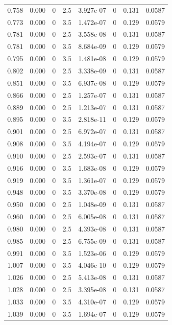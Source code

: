 \documentclass[preview]{standalone}
\begin{document}
{{{\begin{tabular}{L{1.2cm}C{1.2cm} C{0.3cm}C{0.5cm} C{1.4cm}C{1.4cm} C{1.4cm}C{1.4cm}}
  0.758  &  0.000  & 0     & 2.5 &  3.927e-07  & 0  & 0.131 &  0.0587   \\ 
  0.773  &  0.000  & 0     & 3.5 &  1.472e-07  & 0  & 0.129 &  0.0579   \\ 
  0.781  &  0.000  & 0     & 2.5 &  3.558e-08  & 0  & 0.131 &  0.0587   \\ 
  0.781  &  0.000  & 0     & 3.5 &  8.684e-09  & 0  & 0.129 &  0.0579   \\ 
  0.795  &  0.000  & 0     & 3.5 &  1.481e-08  & 0  & 0.129 &  0.0579   \\ 
  0.802  &  0.000  & 0     & 2.5 &  3.338e-09  & 0  & 0.131 &  0.0587   \\ 
  0.851  &  0.000  & 0     & 3.5 &  6.937e-08  & 0  & 0.129 &  0.0579   \\ 
  0.866  &  0.000  & 0     & 2.5 &  1.257e-07  & 0  & 0.131 &  0.0587   \\ 
  0.889  &  0.000  & 0     & 2.5 &  1.213e-07  & 0  & 0.131 &  0.0587   \\ 
  0.895  &  0.000  & 0     & 3.5 &  2.818e-11  & 0  & 0.129 &  0.0579   \\ 
  0.901  &  0.000  & 0     & 2.5 &  6.972e-07  & 0  & 0.131 &  0.0587   \\ 
  0.908  &  0.000  & 0     & 3.5 &  4.194e-07  & 0  & 0.129 &  0.0579   \\ 
  0.910  &  0.000  & 0     & 2.5 &  2.593e-07  & 0  & 0.131 &  0.0587   \\ 
  0.916  &  0.000  & 0     & 3.5 &  1.683e-08  & 0  & 0.129 &  0.0579   \\ 
  0.919  &  0.000  & 0     & 3.5 &  1.361e-07  & 0  & 0.129 &  0.0579   \\ 
  0.948  &  0.000  & 0     & 3.5 &  3.370e-08  & 0  & 0.129 &  0.0579   \\ 
  0.950  &  0.000  & 0     & 2.5 &  1.048e-09  & 0  & 0.131 &  0.0587   \\ 
  0.960  &  0.000  & 0     & 2.5 &  6.005e-08  & 0  & 0.131 &  0.0587   \\ 
  0.980  &  0.000  & 0     & 2.5 &  4.393e-08  & 0  & 0.131 &  0.0587   \\ 
  0.985  &  0.000  & 0     & 2.5 &  6.755e-09  & 0  & 0.131 &  0.0587   \\ 
  0.991  &  0.000  & 0     & 3.5 &  1.523e-06  & 0  & 0.129 &  0.0579   \\ 
  1.007  &  0.000  & 0     & 3.5 &  4.046e-10  & 0  & 0.129 &  0.0579   \\ 
  1.026  &  0.000  & 0     & 2.5 &  5.413e-08  & 0  & 0.131 &  0.0587   \\ 
  1.028  &  0.000  & 0     & 2.5 &  3.395e-08  & 0  & 0.131 &  0.0587   \\ 
  1.033  &  0.000  & 0     & 3.5 &  4.310e-07  & 0  & 0.129 &  0.0579   \\ 
  1.039  &  0.000  & 0     & 3.5 &  1.694e-07  & 0  & 0.129 &  0.0579   \\ 
\hline 
\end{tabular} 

}}}
\end{document}
